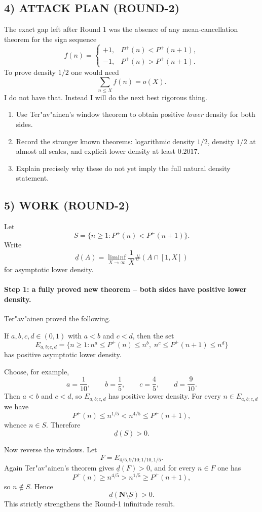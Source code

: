 \subsection*{4) ATTACK PLAN (ROUND-2)}
The exact gap left after Round 1 was the absence of any mean-cancellation theorem for the sign sequence
\[
f(n)=\begin{cases}
+1,& P^{+}(n)<P^{+}(n+1),\\
-1,& P^{+}(n)>P^{+}(n+1).
\end{cases}
\]
To prove density $1/2$ one would need
\[
\sum_{n\leq X} f(n)=o(X).
\]
I do not have that. Instead I will do the next best rigorous thing.
\begin{enumerate}
\item Use Ter"av"ainen's window theorem to obtain positive \emph{lower} density for both sides.
\item Record the stronger known theorems: logarithmic density $1/2$, density $1/2$ at almost all scales, and explicit lower density at least $0.2017$.
\item Explain precisely why these do not yet imply the full natural density statement.
\end{enumerate}

\subsection*{5) WORK (ROUND-2)}
Let
\[
S=\{n\geq 1: P^{+}(n)<P^{+}(n+1)\}.
\]
Write
\[
\underline d(A)=\liminf_{X\to\infty} \frac{1}{X}\#(A\cap [1,X])
\]
for asymptotic lower density.

\paragraph{Step 1: a fully proved new theorem -- both sides have positive lower density.}
Ter"av"ainen proved the following.

If $a,b,c,d\in (0,1)$ with $a<b$ and $c<d$, then the set
\[
E_{a,b;c,d}=\{n\geq 1: n^{a}\leq P^{+}(n)\leq n^{b},\; n^{c}\leq P^{+}(n+1)\leq n^{d}\}
\]
has positive asymptotic lower density.

Choose, for example,
\[
a=\frac{1}{10},\qquad b=\frac{1}{5},\qquad c=\frac{4}{5},\qquad d=\frac{9}{10}.
\]
Then $a<b$ and $c<d$, so $E_{a,b;c,d}$ has positive lower density. For every $n\in E_{a,b;c,d}$ we have
\[
P^{+}(n)\leq n^{1/5}<n^{4/5}\leq P^{+}(n+1),
\]
whence $n\in S$. Therefore
\[
\underline d(S)>0.
\]

Now reverse the windows. Let
\[
F=E_{4/5,9/10;1/10,1/5}.
\]
Again Ter"av"ainen's theorem gives $\underline d(F)>0$, and for every $n\in F$ one has
\[
P^{+}(n)\geq n^{4/5}>n^{1/5}\geq P^{+}(n+1),
\]
so $n\notin S$. Hence
\[
\underline d(\mathbf N\setminus S)>0.
\]
This strictly strengthens the Round-1 infinitude result.

